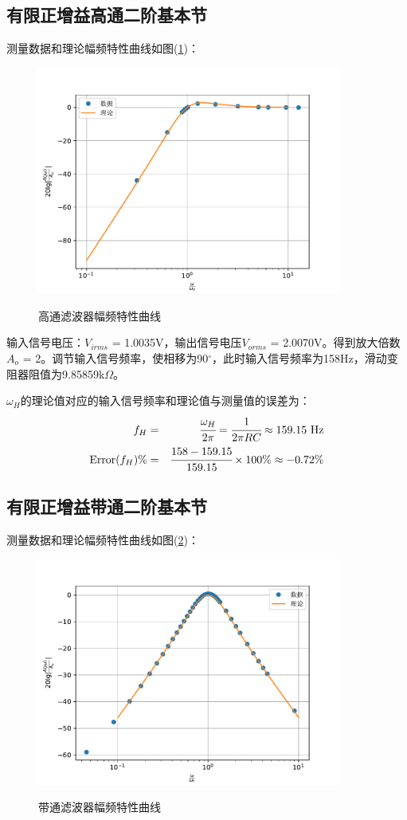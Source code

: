 \documentclass[a4paper]{article}
\begin{document}
\subsection{有限正增益高通二阶基本节}
测量数据和理论幅频特性曲线如图(\ref{datafig2})：
\begin{figure}[!h]
\centering
\includegraphics[width=10cm]{fig/datafig2.pdf}\\
\caption{高通滤波器幅频特性曲线}\label{datafig2}
\end{figure}

输入信号电压：$V_{irms}$ = 1.0035V，输出信号电压$V_{orms}$ = 2.0070V。得到放大倍数$A_o$ = 2。调节输入信号频率，使相移为90$^{\circ}$，此时输入信号频率为158Hz，滑动变阻器阻值为9.85859k$\Omega$。

$\omega_H$的理论值对应的输入信号频率和理论值与测量值的误差为：
\begin{eqnarray}
f_H &=& \cfrac{\omega_H}{2\pi} = \cfrac{1}{2\pi RC} \approx 159.15\text{ Hz} \\
\text{Error($f_H$)\%} &=& \cfrac{158 - 159.15}{159.15}\times 100\% \approx -0.72\%
\end{eqnarray}
\subsection{有限正增益带通二阶基本节}
测量数据和理论幅频特性曲线如图(\ref{datafig3})：
\begin{figure}[!h]
\centering
\includegraphics[width=10cm]{fig/datafig3.pdf}\\
\caption{带通滤波器幅频特性曲线}\label{datafig3}
\end{figure}
\end{document}
